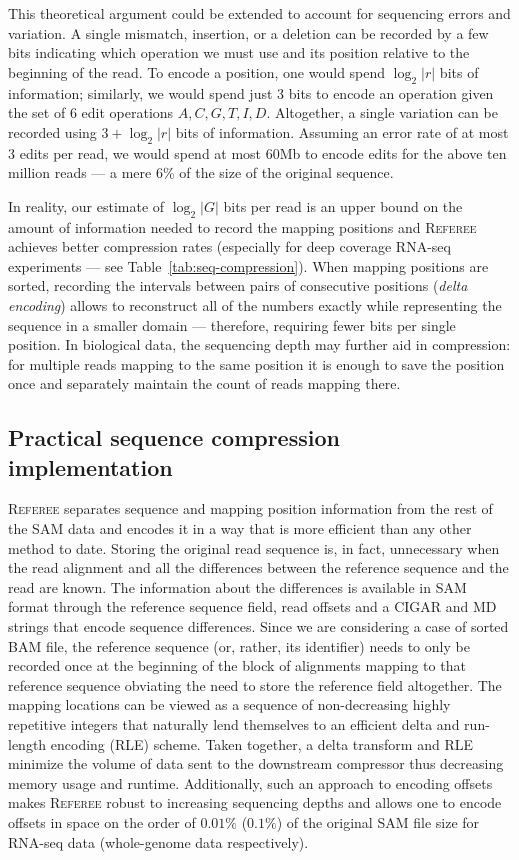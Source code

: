 \documentclass[12pt]{cmuthesis}
\newcommand{\refer}{\textsc{Referee}\xspace}
\begin{document}
  This theoretical argument could be extended to account for sequencing errors and variation. A single mismatch, insertion, or a deletion can be recorded by a few bits indicating which operation we must use and its position relative to the beginning of the read. To encode a position, one would spend $\log_2 |r|$ bits of information; similarly, we would spend just 3 bits to encode an operation given the set of 6 edit operations ${A,C,G,T,I,D}$. Altogether, a single variation can be recorded using $3 + \log_2 |r|$ bits of information. Assuming an error rate of at most 3 edits per read, we would spend at most 60Mb to encode edits for the above ten million reads --- a mere 6\% of the size of the original sequence.

  In reality, our estimate of $\log_2 |G|$ bits per read is an upper bound on the amount of information needed to record the mapping positions and \refer achieves better compression rates (especially for deep coverage RNA-seq experiments --- see Table~\ref{tab:seq-compression}). When mapping positions are sorted, recording the intervals between pairs of consecutive positions (\textit{delta encoding}) allows to reconstruct all of the numbers exactly while representing the sequence in a smaller domain --- therefore, requiring fewer bits per single position. In biological data, the sequencing depth may further aid in compression: for multiple reads mapping to the same position it is enough to save the position once and separately maintain the count of reads mapping there.

  \subsection{Practical sequence compression implementation} %
  \refer separates sequence and mapping position information from the rest of the SAM data and encodes it in a way that is more efficient than any other method to date. Storing the original read sequence is, in fact, unnecessary when the read alignment and all the differences between the reference sequence and the read are known. The information about the differences is available in SAM format through the reference sequence field, read offsets and a CIGAR and MD strings that encode sequence differences. Since we are considering a case of sorted BAM file, the reference sequence (or, rather, its identifier) needs to only be recorded once at the beginning of the block of alignments mapping to that reference sequence obviating the need to store the reference field altogether. The mapping locations can be viewed as a sequence of non-decreasing highly repetitive integers that naturally lend themselves to an efficient delta and run-length encoding (RLE) scheme. Taken together, a delta transform and RLE minimize the volume of data sent to the downstream compressor thus decreasing memory usage and runtime. Additionally, such an approach to encoding offsets makes \refer robust to increasing sequencing depths and allows one to encode offsets in space on the order of $0.01\%$ ($0.1\%$) of the original SAM file size for RNA-seq data (whole-genome data respectively).
\end{document}
